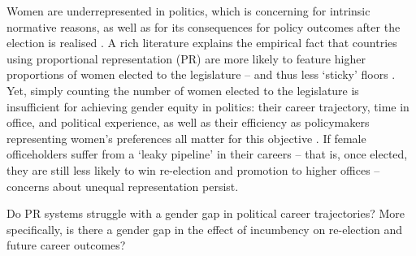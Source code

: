 \documentclass[12pt]{article}
\begin{document}
%
%



Women are underrepresented in politics, which is concerning for intrinsic normative reasons, as well as for its consequences for policy outcomes after the election is realised \citep{mansbridge1999, mansbridge2003,chattopadhyay2004,dahlerup2013}. A rich literature explains the empirical fact that countries using proportional representation (PR) are more likely to feature higher proportions of women elected to the legislature -- and thus less `sticky' floors \citep[][]{norris1985,matland1996,matland1998,thames2010,roberts2013,casas-arce2015,thames2016,golder2017a,verge2019a,lucardi2020,profeta2022}. Yet, simply counting the number of women elected to the legislature is insufficient for achieving gender equity in politics: their career trajectory, time in office, and political experience, as well as their efficiency as policymakers representing women's preferences all matter for this objective \citep{smrek2020}. If female officeholders suffer from a `leaky pipeline' \citep{cipullo2021} in their careers -- that is, once elected, they are still less likely to win re-election and promotion to higher offices -- concerns about unequal representation persist.

Do PR systems struggle with a gender gap in political career trajectories? More specifically, is there a gender gap in the effect of incumbency on re-election and future career outcomes?
\end{document}
